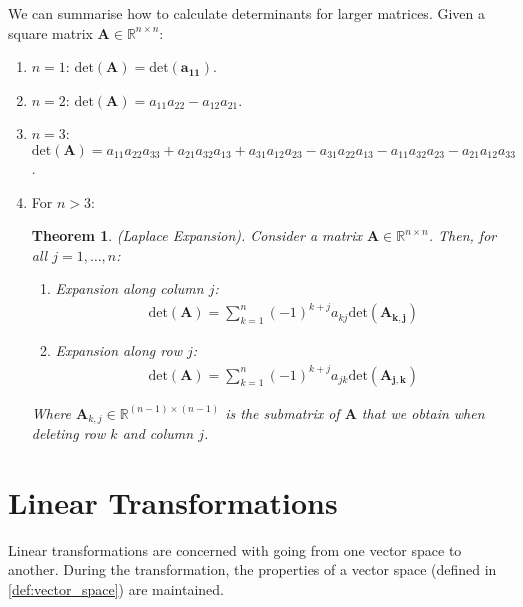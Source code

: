\documentclass[a4paper,12pt]{book}
\newcommand{\matrx}[1]{\bm{#1}}
\newcommand{\real}{\mathbb{R}}
\newcommand{\dett}[1]{\text{det}(\matrx{#1})}
\newtheorem{theorem}{Theorem}[section]
\begin{document}
	We can summarise how to calculate determinants for larger matrices. Given a square matrix $ \matrx{A} \in \real^{n \times n} $:
	\begin{enumerate}
		\item $ n = 1 $: $ \dett{A} = \dett{a_{11}} $.
		\item $ n = 2 $: $ \dett{A} = a_{11}a_{22} - a_{12}a_{21} $.
		\item $ n = 3 $: $ \dett{A} = a_{11}a_{22}a_{33} + a_{21}a_{32}a_{13} + a_{31}a_{12}a_{23} - a_{31}a_{22}a_{13} - a_{11}a_{32}a_{23} - a_{21}a_{12}a_{33}$.
		\item For $ n > 3 $: \begin{theorem}
			\normalfont (Laplace Expansion). Consider a matrix $ \matrx{A} \in \real^{n \times n} $. Then, for all $ j = 1,\ldots,n $:
			\begin{enumerate}
				\item Expansion along column $ j $:
				\begin{align}
					\dett{A} = \sum_{k = 1}^{n} (-1)^{k + j} a_{kj} \dett{A_{k,j}}
				\end{align}
				\item Expansion along row $ j $:
				\begin{align}
					\dett{A} = \sum_{k = 1}^{n} (-1)^{k + j} a_{jk} \dett{A_{j,k}}
				\end{align}
			\end{enumerate}
		Where $ \matrx{A}_{k,j} \in \real^{(n - 1) \times (n - 1)} $ is the submatrix of $ \matrx{A} $ that we obtain when deleting row $ k $ and column $ j $. 
		\end{theorem}
	\end{enumerate}
	
	\section{Linear Transformations}
	Linear transformations are concerned with going from one vector space to another. During the transformation, the properties of a vector space (defined in \ref{def:vector_space}) are maintained. 
	
\end{document}
